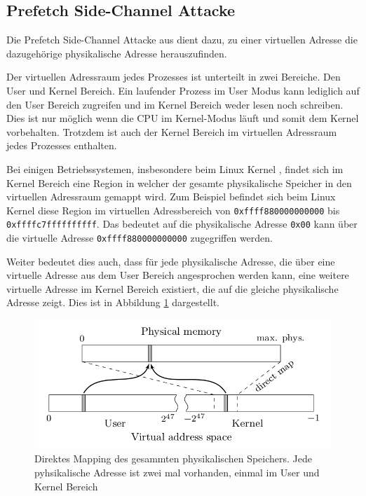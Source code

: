 \documentclass[conference]{IEEEtran}
\begin{document}
\subsection{Prefetch Side-Channel Attacke}

Die Prefetch Side-Channel Attacke aus \cite{DBLP:conf/ccs/2016} dient dazu, zu einer virtuellen Adresse die dazugehörige physikalische Adresse herauszufinden. 

Der virtuellen Adressraum jedes Prozesses ist unterteilt in zwei Bereiche. Den User und Kernel Bereich. Ein laufender Prozess im User Modus kann lediglich auf den User Bereich zugreifen und im Kernel Bereich weder lesen noch schreiben. Dies ist nur möglich wenn die CPU im Kernel-Modus läuft und somit dem Kernel vorbehalten. Trotzdem ist auch der Kernel Bereich im virtuellen Adressraum jedes Prozesses enthalten.

Bei einigen Betriebssystemen, insbesondere beim Linux Kernel \cite{virtual-momory}, findet sich im Kernel Bereich eine Region in welcher der gesamte physikalische Speicher in den virtuellen Adressraum gemappt wird.
Zum Beispiel befindet sich beim Linux Kernel diese Region im virtuellen Adressbereich von \texttt{0xffff880000000000} bis \texttt{0xffffc7ffffffffff}.
Das bedeutet auf die physikalische Adresse \texttt{0x00} kann über die virtuelle Adresse \texttt{0xffff880000000000} zugegriffen werden.

Weiter bedeutet dies auch, dass für jede physikalische Adresse, die über eine virtuelle Adresse aus dem User Bereich angesprochen werden kann, eine weitere virtuelle Adresse im Kernel Bereich existiert, die auf die gleiche physikalische Adresse zeigt. Dies ist in Abbildung \ref{fig:direct-mapping} dargestellt.

\begin{figure}
	\centering
	\includegraphics[width=1\linewidth]{direct-mapping}
	\caption{Direktes Mapping des gesammten physikalischen Speichers. Jede pyhsikalische Adresse ist zwei mal vorhanden, einmal im User und Kernel Bereich \cite{DBLP:conf/ccs/2016}}
	\label{fig:direct-mapping}
\end{figure}
\end{document}
